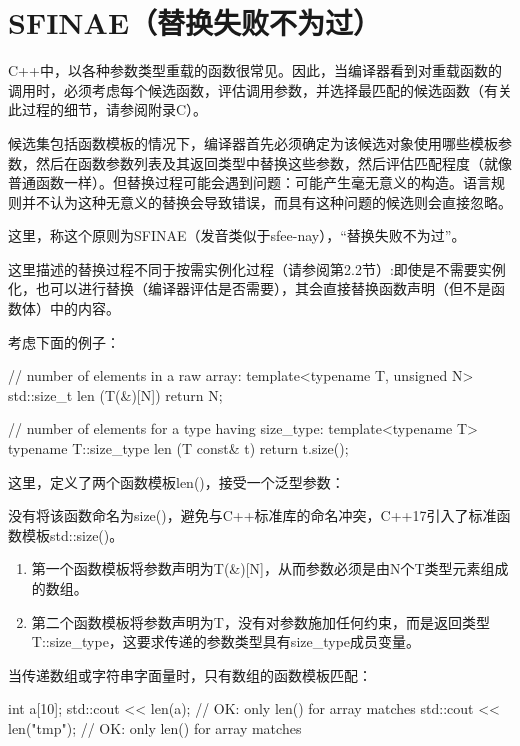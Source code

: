 \section{SFINAE（替换失败不为过）}

C++中，以各种参数类型重载的函数很常见。因此，当编译器看到对重载函数的调用时，必须考虑每个候选函数，评估调用参数，并选择最匹配的候选函数（有关此过程的细节，请参阅附录C）。

候选集包括函数模板的情况下，编译器首先必须确定为该候选对象使用哪些模板参数，然后在函数参数列表及其返回类型中替换这些参数，然后评估匹配程度（就像普通函数一样）。但替换过程可能会遇到问题：可能产生毫无意义的构造。语言规则并不认为这种无意义的替换会导致错误，而具有这种问题的候选则会直接忽略。

这里，称这个原则为SFINAE（发音类似于sfee-nay），“替换失败不为过”。

这里描述的替换过程不同于按需实例化过程（请参阅第2.2节）:即使是不需要实例化，也可以进行替换（编译器评估是否需要），其会直接替换函数声明（但不是函数体）中的内容。

考虑下面的例子：

\begin{cpp}
// number of elements in a raw array:
template<typename T, unsigned N>
std::size_t len (T(&)[N])
{
	return N;
}

// number of elements for a type having size_type:
template<typename T>
typename T::size_type len (T const& t)
{
	return t.size();
}
\end{cpp}

这里，定义了两个函数模板len()，接受一个泛型参数：

\begin{notice}
没有将该函数命名为size()，避免与C++标准库的命名冲突，C++17引入了标准函数模板std::size()。
\end{notice}

\begin{enumerate}
\item 
第一个函数模板将参数声明为T(\&)[N]，从而参数必须是由N个T类型元素组成的数组。

\item 
第二个函数模板将参数声明为T，没有对参数施加任何约束，而是返回类型T::size\_type，这要求传递的参数类型具有size\_type成员变量。
\end{enumerate}

当传递数组或字符串字面量时，只有数组的函数模板匹配：

\begin{cpp}
int a[10];
std::cout << len(a); // OK: only len() for array matches
std::cout << len("tmp"); // OK: only len() for array matches
\end{cpp}

